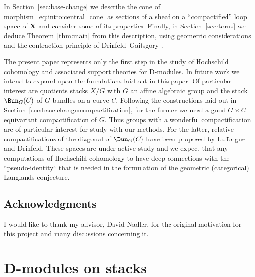 \documentclass[english]{ck-article}
\let\stack\mathbf
\begin{document}
In Section~\ref{sec:base-change} we describe the cone of morphism~\eqref{eq:intro:central_cone} as sections of a sheaf on a \enquote{compactified} loop space of $\stack X$ and consider some of its properties.
Finally, in Section~\ref{sec:torus} we deduce Theorem~\ref{thm:main} from this description, using geometric considerations and the contraction principle of Drinfeld--Gaitsgory \cite{DrinfeldGaitsgory:2014:OnATheoremOfBraden}.

The present paper represents only the first step in the study of Hochschild cohomology and associated support theories for D-modules.
In future work we intend to expand upon the foundations laid out in this paper.
Of particular interest are quotients stacks $X/G$ with $G$ an affine algebraic group and the stack $\Bun_G(C)$ of $G$-bundles on a curve $C$.
Following the constructions laid out in Section~\ref{sec:base-change:compactification}, for the former we need a good $G×G$-equivariant compactification of $G$.
Thus groups with a wonderful compactification are of particular interest for study with our methods.
For the latter, relative compactifications of the diagonal of $\Bun_G(C)$ have been proposed by Lafforgue and Drinfeld.
These spaces are under active study and we expect that any computations of Hochschild cohomology to have deep connections with the \enquote{pseudo-identity} that is needed in the formulation of the geometric (categorical) Langlands conjecture.%

\subsection*{Acknowledgments}
I would like to thank my advisor, David Nadler, for the original motivation for this project and many discussions concerning it.


\section{D-modules on stacks}
\label{sec:d-mods}
\end{document}
